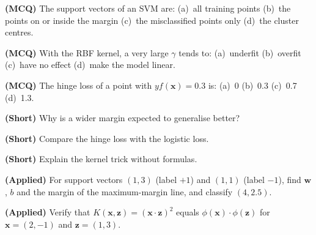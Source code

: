 \begin{reviewq}
  \item \textbf{(MCQ)} The support vectors of an SVM are: (a)~all training points
        (b)~the points on or inside the margin (c)~the misclassified points only
        (d)~the cluster centres.
  \item \textbf{(MCQ)} With the RBF kernel, a very large $\gamma$ tends to:
        (a)~underfit (b)~overfit (c)~have no effect (d)~make the model linear.
  \item \textbf{(MCQ)} The hinge loss of a point with $y f(\mathbf{x}) = 0.3$ is:
        (a)~0 (b)~0.3 (c)~0.7 (d)~1.3.
  \item \textbf{(Short)} Why is a wider margin expected to generalise better?
  \item \textbf{(Short)} Compare the hinge loss with the logistic loss.
  \item \textbf{(Short)} Explain the kernel trick without formulas.
  \item \textbf{(Applied)} For support vectors $(1, 3)$ (label $+1$) and $(1, 1)$
        (label $-1$), find $\mathbf{w}$, $b$ and the margin of the maximum-margin
        line, and classify $(4, 2.5)$.
  \item \textbf{(Applied)} Verify that $K(\mathbf{x}, \mathbf{z}) = (\mathbf{x}\cdot\mathbf{z})^2$
        equals $\phi(\mathbf{x})\cdot\phi(\mathbf{z})$ for $\mathbf{x} = (2, -1)$ and
        $\mathbf{z} = (1, 3)$.
\end{reviewq}
